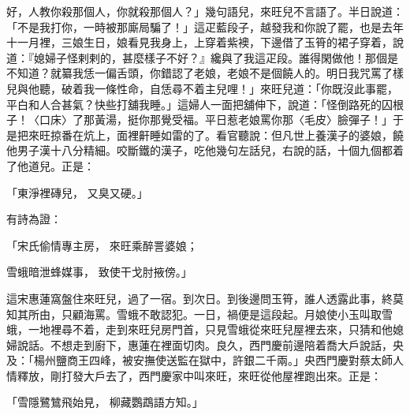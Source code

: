 好，人教你殺那個人，你就殺那個人？」幾句語兒，來旺兒不言語了。半日說道：「不是我打你，一時被那廝局騙了！」這疋藍段子，越發我和你說了罷，也是去年十一月裡，三娘生日，娘看見我身上，上穿着紫襖，下邊借了玉筲的裙子穿着，說道：『媳婦子怪剌剌的，甚麼樣子不好？』纔與了我這疋段。誰得閑做他！那個是不知道？就纂我恁一偏舌頭，你錯認了老娘，老娘不是個饒人的。明日我咒罵了樣兒與他聽，破着我一條性命，自恁尋不着主兒哩！」來旺兒道：「你既沒此事罷，平白和人合甚氣？快些打舖我睡。」這婦人一面把舖伸下，說道：「怪倒路死的囚根子！〈口床〉了那黃湯，挺你那覺受福。平日惹老娘罵你那〈毛皮〉臉彈子！」于是把來旺掠番在炕上，面裡鼾睡如雷的了。看官聽說：但凡世上養漢子的婆娘，饒他男子漢十八分精細。咬斷鐵的漢子，吃他幾句左話兒，右說的話，十個九個都着了他道兒。正是：

「東淨裡磚兒，  又臭又硬。」

有詩為證：

「宋氏偷情專主房，  來旺乘醉詈婆娘；

雪蛾暗泄蜂媒事，  致使干戈肘掖傍。」

這宋惠蓮窩盤住來旺兒，過了一宿。到次日。到後邊問玉筲，誰人透露此事，終莫知其所由，只顧海罵。雪蛾不敢認犯。一日，禍便是這段起。月娘使小玉叫取雪蛾，一地裡尋不着，走到來旺兒房門首，只見雪蛾從來旺兒屋裡去來，只猜和他媳婦說話。不想走到廚下，惠蓮在裡面切肉。良久，西門慶前邊陪着喬大戶說話，央及：「楊州鹽商王四峰，被安撫使送監在獄中，許銀二千兩。」央西門慶對蔡太師人情釋放，剛打發大戶去了，西門慶家中叫來旺，來旺從他屋裡跑出來。正是：

「雪隱鷺鷥飛始見，  柳藏鸚鵡語方知。」

